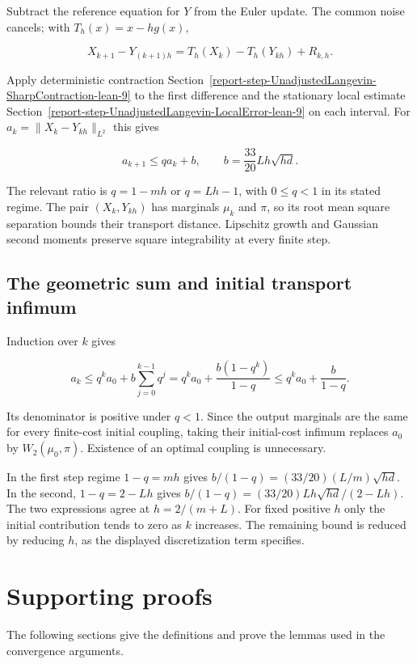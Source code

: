 \documentclass[11pt,a4paper]{report}
\begin{document}
Subtract the reference equation for \(Y\) from the Euler update. The common noise cancels; with \(T_h(x)=x-hg(x)\),

\[X_{k+1}-Y_{(k+1)h}=T_h(X_k)-T_h(Y_{kh})+R_{k,h}.\]

Apply deterministic contraction Section~\ref{report-step-UnadjustedLangevin-SharpContraction-lean-9} to the first difference and the stationary local estimate Section~\ref{report-step-UnadjustedLangevin-LocalError-lean-9} on each interval. For \(a_k=\|X_k-Y_{kh}\|_{L^2}\) this gives

\[a_{k+1}\le q a_k+b,\qquad b=\frac{33}{20}Lh\sqrt{hd}.\]

The relevant ratio is \(q=1-mh\) or \(q=Lh-1\), with \(0\le q<1\) in its stated regime. The pair \((X_k,Y_{kh})\) has marginals \(\mu_k\) and \(\pi\), so its root mean square separation bounds their transport distance. Lipschitz growth and Gaussian second moments preserve square integrability at every finite step.


\section{\texorpdfstring{The geometric sum and initial transport infimum}{The geometric sum and initial transport infimum}}



Induction over \(k\) gives

\[a_k\le q^ka_0+b\sum_{j=0}^{k-1}q^j
=q^ka_0+\frac{b(1-q^k)}{1-q}
\le q^ka_0+\frac b{1-q}.\]

Its denominator is positive under \(q<1\). Since the output marginals are the same for every finite-cost initial coupling, taking their initial-cost infimum replaces \(a_0\) by \(W_2(\mu_0,\pi)\). Existence of an optimal coupling is unnecessary.



In the first step regime \(1-q=mh\) gives \(b/(1-q)=(33/20)(L/m)\sqrt{hd}\). In the second, \(1-q=2-Lh\) gives \(b/(1-q)=(33/20)Lh\sqrt{hd}/(2-Lh)\). The two expressions agree at \(h=2/(m+L)\). For fixed positive \(h\) only the initial contribution tends to zero as \(k\) increases. The remaining bound is reduced by reducing \(h\), as the displayed discretization term specifies.


\chapter{Supporting proofs}
The following sections give the definitions and prove the lemmas used in the convergence arguments.
\end{document}
